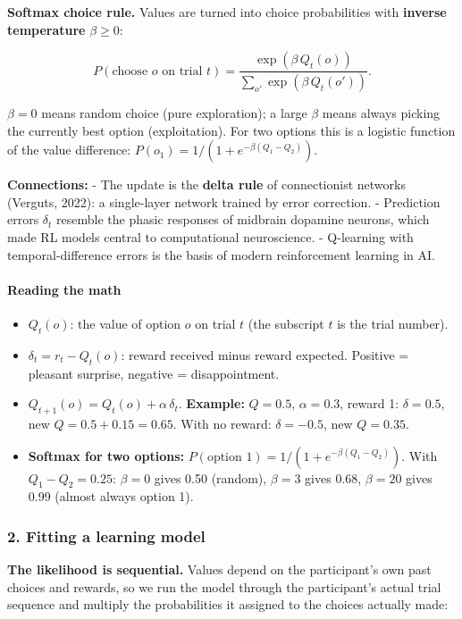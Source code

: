 \textbf{Softmax choice rule.} Values are turned into choice
probabilities with \textbf{inverse temperature} \(\beta \ge 0\):

\[
P(\text{choose } o \text{ on trial } t) = \frac{\exp(\beta\, Q_t(o))}{\sum_{o'} \exp(\beta\, Q_t(o'))}.
\]

\(\beta = 0\) means random choice (pure exploration); a large \(\beta\)
means always picking the currently best option (exploitation). For two
options this is a logistic function of the value difference:
\(P(o_1) = 1/(1 + e^{-\beta(Q_1 - Q_2)})\).

\textbf{Connections:} - The update is the \textbf{delta rule} of
connectionist networks (Verguts, 2022): a single-layer network trained
by error correction. - Prediction errors \(\delta_t\) resemble the
phasic responses of midbrain dopamine neurons, which made RL models
central to computational neuroscience. - Q-learning with
temporal-difference errors is the basis of modern reinforcement learning
in AI.

\paragraph{Reading the math}

\begin{itemize}
\tightlist
\item
  \(Q_t(o)\): the value of option \(o\) on trial \(t\) (the subscript
  \(t\) is the trial number).
\item
  \(\delta_t = r_t - Q_t(o)\): reward received minus reward expected.
  Positive = pleasant surprise, negative = disappointment.
\item
  \(Q_{t+1}(o) = Q_t(o) + \alpha\,\delta_t\). \textbf{Example:}
  \(Q = 0.5\), \(\alpha = 0.3\), reward 1: \(\delta = 0.5\), new
  \(Q = 0.5 + 0.15 = 0.65\). With no reward: \(\delta = -0.5\), new
  \(Q = 0.35\).
\item
  \textbf{Softmax for two options:}
  \(P(\text{option 1}) = 1/(1 + e^{-\beta(Q_1 - Q_2)})\). With
  \(Q_1 - Q_2 = 0.25\): \(\beta = 0\) gives 0.50 (random), \(\beta = 3\)
  gives 0.68, \(\beta = 20\) gives 0.99 (almost always option 1).
\end{itemize}

\subsubsection{2. Fitting a learning model}

\textbf{The likelihood is sequential.} Values depend on the
participant's own past choices and rewards, so we run the model through
the participant's actual trial sequence and multiply the probabilities
it assigned to the choices actually made:


